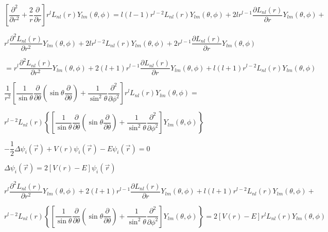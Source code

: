 \documentclass{jarticle}%
\begin{document}
$\left[  \dfrac{\partial^{2}}{\partial r^{2}}+\dfrac{2}{r}\dfrac{\partial
}{\partial r}\right]  r^{l}L_{nl}\left(  r\right)  Y_{lm}\left(  \theta
,\phi\right)  =l\left(  l-1\right)  r^{l-2}L_{nl}\left(  r\right)
Y_{lm}\left(  \theta,\phi\right)  +2lr^{l-1}\dfrac{\partial L_{nl}\left(
r\right)  }{\partial r}Y_{lm}\left(  \theta,\phi\right)  +$

$r^{l}\dfrac{\partial^{2}L_{nl}\left(  r\right)  }{\partial r^{2}}%
Y_{lm}\left(  \theta,\phi\right)  +2lr^{l-2}L_{nl}\left(  r\right)
Y_{lm}\left(  \theta,\phi\right)  +2r^{l-1}\dfrac{\partial L_{nl}\left(
r\right)  }{\partial r}Y_{lm}\left(  \theta,\phi\right)  $

$=r^{l}\dfrac{\partial^{2}L_{nl}\left(  r\right)  }{\partial r^{2}}%
Y_{lm}\left(  \theta,\phi\right)  +2\left(  l+1\right)  r^{l-1}\dfrac{\partial
L_{nl}\left(  r\right)  }{\partial r}Y_{lm}\left(  \theta,\phi\right)
+l\left(  l+1\right)  r^{l-2}L_{nl}\left(  r\right)  Y_{lm}\left(  \theta
,\phi\right)  $

$\dfrac{1}{r^{2}}\left[  \dfrac{1}{\sin\theta}\dfrac{\partial}{\partial\theta
}\left(  \sin\theta\dfrac{\partial}{\partial\theta}\right)  +\dfrac{1}%
{\sin^{2}\theta}\dfrac{\partial^{2}}{\partial\phi^{2}}\right]  r^{l}%
L_{nl}\left(  r\right)  Y_{lm}\left(  \theta,\phi\right)  =$

$r^{l-2}L_{nl}\left(  r\right)  \left\{  \left[  \dfrac{1}{\sin\theta}%
\dfrac{\partial}{\partial\theta}\left(  \sin\theta\dfrac{\partial}%
{\partial\theta}\right)  +\dfrac{1}{\sin^{2}\theta}\dfrac{\partial^{2}%
}{\partial\phi^{2}}\right]  Y_{lm}\left(  \theta,\phi\right)  \right\}  $

$-\dfrac{1}{2}\Delta\psi_{i}\left(  \vec{r}\right)  +V\left(  r\right)
\psi_{i}\left(  \vec{r}\right)  -E\psi_{i}\left(  \vec{r}\right)  =0$

$\Delta\psi_{i}\left(  \vec{r}\right)  =2\left[  V\left(  r\right)  -E\right]
\psi_{i}\left(  \vec{r}\right)  $

$r^{l}\dfrac{\partial^{2}L_{nl}\left(  r\right)  }{\partial r^{2}}%
Y_{lm}\left(  \theta,\phi\right)  +2\left(  l+1\right)  r^{l-1}\dfrac{\partial
L_{nl}\left(  r\right)  }{\partial r}Y_{lm}\left(  \theta,\phi\right)
+l\left(  l+1\right)  r^{l-2}L_{nl}\left(  r\right)  Y_{lm}\left(  \theta
,\phi\right)  +$

$r^{l-2}L_{nl}\left(  r\right)  \left\{  \left[  \dfrac{1}{\sin\theta}%
\dfrac{\partial}{\partial\theta}\left(  \sin\theta\dfrac{\partial}%
{\partial\theta}\right)  +\dfrac{1}{\sin^{2}\theta}\dfrac{\partial^{2}%
}{\partial\phi^{2}}\right]  Y_{lm}\left(  \theta,\phi\right)  \right\}
=2\left[  V\left(  r\right)  -E\right]  r^{l}L_{nl}\left(  r\right)
Y_{lm}\left(  \theta,\phi\right)  $
\end{document}
